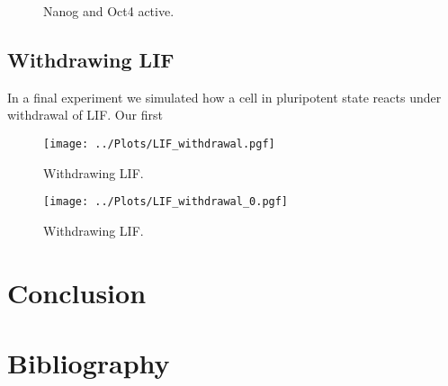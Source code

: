 \begin{figure}
\centering
\begin{minipage}[t]{0.3\textwidth}
\centering
\graphicspath{{../Plots/}}

\end{minipage}
\hspace*{0.5cm}
\begin{minipage}[t]{0.3\textwidth}
\centering
\graphicspath{{../Plots/}}

\end{minipage}
\caption{Nanog and Oct4 active.}
\label{pl:NO}
\end{figure}

\subsection{Withdrawing LIF}

In a final experiment we simulated how a cell in pluripotent state reacts under withdrawal of LIF.
Our first 

\begin{figure}
  \centering
  \graphicspath{{../Plots/}}
  \texttt{[image: ../Plots/LIF\_withdrawal.pgf]}
  \caption{Withdrawing LIF.}
  \label{pl:LIF_withdrawal}
\end{figure}

\begin{figure}
  \centering
  \graphicspath{{../Plots/}}
  \texttt{[image: ../Plots/LIF\_withdrawal\_0.pgf]}
  \caption{Withdrawing LIF.}
  \label{pl:LIF_withdrawal}
\end{figure}
    
\section{Conclusion}

\newpage
\section*{Bibliography}
\nocite{*}
\printbibliography[heading=none, keyword={secondary}]



